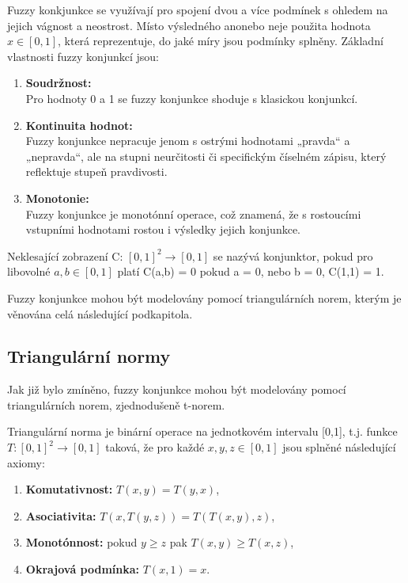 Fuzzy konkjunkce se využívají pro spojení dvou a více podmínek s ohledem na jejich vágnost a neostrost. Místo výsledného \clqq ano\crqq \space nebo \clqq ne\crqq \space je použita hodnota  $x \in [0,1]$, která reprezentuje, do jaké míry jsou podmínky splněny.  
Základní vlastnosti fuzzy konjunkcí jsou:
\begin{enumerate}
    \item \textbf{Soudržnost:}\\
    Pro hodnoty 0 a 1 se fuzzy konjunkce shoduje s klasickou konjunkcí.
    \item \textbf{Kontinuita hodnot:}\\
    Fuzzy konjunkce nepracuje jenom s  ostrými hodnotami „pravda“ a „nepravda“, ale na stupni neurčitosti či specifickým číselném zápisu, který reflektuje stupeň pravdivosti.
    \item \textbf{Monotonie:}\\
    Fuzzy konjunkce je monot\'onní operace, což znamená, že s rostoucími vstupními hodnotami rostou i výsledky jejich konjunkce.
\end{enumerate}
\begin{definition}
    \cite{KMP}
    Neklesající zobrazení C: $[0,1]^2 \rightarrow [0,1]$ se nazývá konjunktor, pokud pro libovolné $a,b \in [0,1]$ platí
    C(a,b) = 0 pokud a = 0, nebo b = 0,
    C(1,1) = 1.
    \end{definition}

\begin{remark}
    Fuzzy konjunkce mohou být modelovány pomocí triangulárních norem, kterým je věnována celá následující podkapitola.
\end{remark}

\subsection{Triangul\'arn\'i normy} 

Jak již bylo zmíněno, fuzzy konjunkce mohou být modelov\' any pomocí triangulárních norem, zjednodušeně t-norem. 
\begin{definition}
\cite{KMP}
    Triangulární norma je binární operace na jednotkovém intervalu [0,1], t.j. funkce $T: [0,1]^2 \rightarrow [0,1]$ taková, že pro každé $x, y, z \in [0,1]$ jsou splněné následující axiomy:
    \begin{enumerate}
        \item \textbf{Komutativnost:} $T(x,y) = T(y,x)$,
        \item \textbf{Asociativita:} $T(x, T(y, z)) = T(T(x, y), z)$,
        \item \textbf{Monotónnost:} pokud $y \geq z$ pak $T(x, y) \geq T(x, z)$,
        \item \textbf{Okrajová podmínka:} $T(x, 1) = x$.
    \end{enumerate}
\end{definition}

